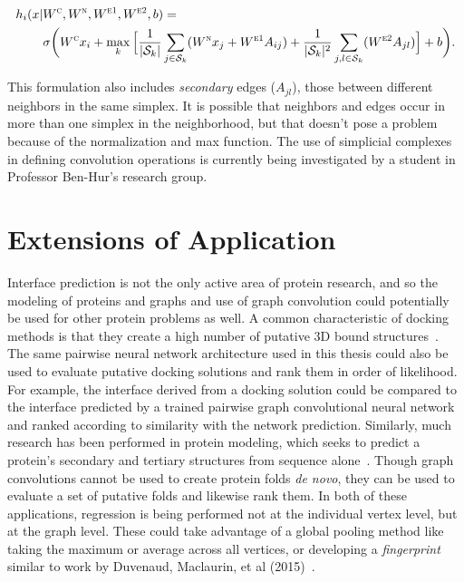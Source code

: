 \begin{equation}
\begin{split}
h_i(x |  & W^{\textsc{c}}, W^{\textsc{n}}, W^{\textsc{e1}}, W^{\textsc{e2}}, b) = \\ 
&\sigma \bigg( W^{\textsc{c}} x_i + \max_{k} \Big[ \frac{1}{|\mathcal{S}_k|}  \sum_{j \in \mathcal{S}_k} ( W^{\textsc{n}} x_j + W^{\textsc{e1}} A_{ij} ) + \frac{1}{|\mathcal{S}_k|^{2}}\sum_{j, l \in \mathcal{S}_k} (W^{\textsc{e2}} A_{jl}) \Big] + b \bigg).
\end{split}
\label{eq:simplicial_complex_conv}
\end{equation}

\noindent
This formulation also includes \emph{secondary} edges ($A_{jl}$), those between different neighbors in the same simplex.
It is possible that neighbors and edges occur in more than one simplex in the neighborhood, but that doesn't pose a problem because of the normalization and max function.
The use of simplicial complexes in defining convolution operations is currently being investigated by a student in Professor Ben-Hur's research group.


\section{Extensions of Application}

Interface prediction is not the only active area of protein research, and so the modeling of proteins and graphs and use of graph convolution could potentially be used for other protein problems as well.
A common characteristic of docking methods is that they create a high number of putative 3D bound structures~\cite{janin2013}.
The same pairwise neural network architecture used in this thesis could also be used to evaluate putative docking solutions and rank them in order of likelihood.
For example, the interface derived from a docking solution could be compared to the interface predicted by a trained pairwise graph convolutional neural network and ranked according to similarity with the network prediction.
Similarly, much research has been performed in protein modeling, which seeks to predict a protein's secondary and tertiary structures from sequence alone~\cite{schwede2013}.
Though graph convolutions cannot be used to create protein folds \emph{de novo}, they can be used to evaluate a set of putative folds and likewise rank them.
In both of these applications, regression is being performed not at the individual vertex level, but at the graph level.
These could take advantage of a global pooling method like taking the maximum or average across all vertices, or developing a \emph{fingerprint} similar to work by Duvenaud, Maclaurin, et al (2015)~\cite{duvenaud2015}.

